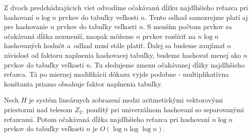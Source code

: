 Z dvoch predchádzajúcich viet odvodíme očakávanú dĺžku najdlhšieho reťazca pri hashovaní $n \log n$ prvkov do tabuľky veľkosti $n$. Tento odhad samozrejme platí aj pre hashovanie $n$ prvkov do tabuľky veľkosti $n$. S menším počtom prvkov sa očakávaná dĺžka nezmenší, naopak môžeme $n$ prvkov rozšíriť na $n \log n$ hashovaných hodnôt a~odhad musí stále platiť. Ďalej sa budeme zaujímať o závislosť od faktoru naplnenia hashovacej tabuľky, budeme hashovať menej ako $n$ prvkov do tabuľky veľkosti $n$. Tu sledujeme zmenu očakávanej dĺžky najdlhšieho reťazca. Tá po miernej modifikácii dôkazu vyjde podobne - multiplikatívna konštanta priamo obsahuje faktor naplnenia tabuľky.

\begin{theorem}
\label{theorem-n-logn-to-n}
Nech $H$ je systém lineárnych zobrazení medzi aritmetickými vektorovými priestormi nad telesom $Z_2$. použitý pri univerzálnom hashovaní so separovanými reťazcami. Potom očakávaná dĺžka najdlhšieho reťazca pri hashovaní $n \log n$ prvkov do tabuľky veľkosti $n$ je $O(\log n \log \log n)$.
\end{theorem}
